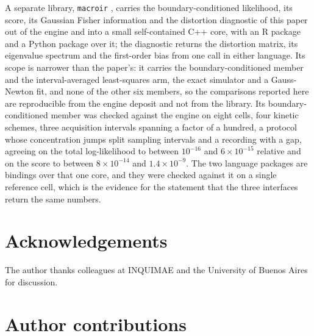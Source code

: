 A separate library, \texttt{macroir} \citep{moffatt2026macroirlib}, carries the
boundary-conditioned likelihood, its score, its Gaussian Fisher information and the distortion
diagnostic of this paper out of the engine and into a small self-contained C++ core, with an R
package and a Python package over it; the diagnostic returns the distortion matrix, its
eigenvalue spectrum and the first-order bias from one call in either language. Its scope is
narrower than the paper's: it carries the boundary-conditioned member and the interval-averaged
least-squares arm, the exact simulator and a Gauss-Newton fit, and none of the other six members,
so the comparisons reported here are reproducible from the engine deposit and not from the
library. Its boundary-conditioned member was checked against the engine on eight cells, four
kinetic schemes, three acquisition intervals spanning a factor of a hundred, a protocol whose
concentration jumps split sampling intervals and a recording with a gap, agreeing on the total
log-likelihood to between $10^{-16}$ and $6\times10^{-15}$ relative and on the score to between
$8\times10^{-14}$ and $1.4\times10^{-9}$. The two language
packages are bindings over that one core, and they were checked against it on a single reference
cell, which is the evidence for the statement that the three interfaces return the same numbers.

\section*{Acknowledgements}

The author thanks colleagues at INQUIMAE and the University of Buenos Aires for discussion. %

\section*{Author contributions}

